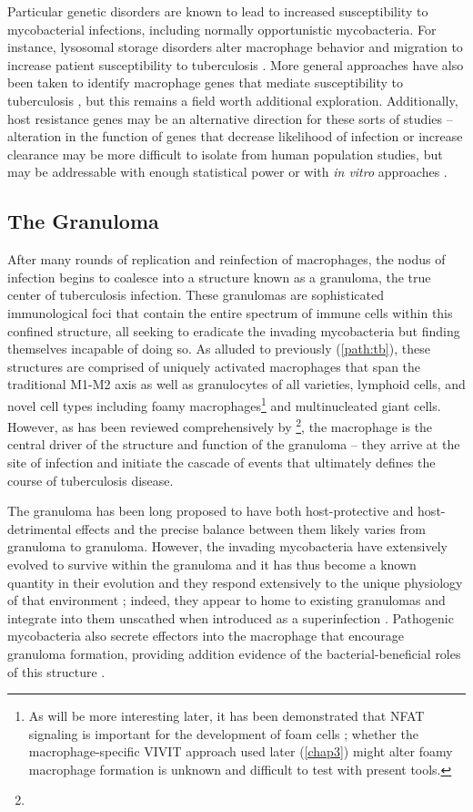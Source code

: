 Particular genetic disorders are known to lead to increased susceptibility to mycobacterial infections, including normally opportunistic mycobacteria. For instance, lysosomal storage disorders alter macrophage behavior and migration to increase patient susceptibility to tuberculosis \citep{Berg2016}. More general approaches have also been taken to identify macrophage genes that mediate susceptibility to tuberculosis \citep{Thuong2008}, but this remains a field worth additional exploration. Additionally, host resistance genes may be an alternative direction for these sorts of studies -- alteration in the function of genes that decrease likelihood of infection or increase clearance may be more difficult to isolate from human population studies, but may be addressable with enough statistical power or with \textit{in vitro} approaches \citep{Bourgeois2021}.

\subsection{The Granuloma}\label{mamaw}

After many rounds of replication and reinfection of macrophages, the nodus of infection begins to coalesce into a structure known as a granuloma, the true center of tuberculosis infection. These granulomas are sophisticated immunological foci that contain the entire spectrum of immune cells within this confined structure, all seeking to eradicate the invading mycobacteria but finding themselves incapable of doing so. As alluded to previously (\autoref{path:tb}), these structures are comprised of uniquely activated macrophages that span the traditional M1\hyp{}M2 axis as well as granulocytes of all varieties, lymphoid cells, and novel cell types including foamy macrophages\footnote{As will be more interesting later, it has been demonstrated that NFAT signaling is important for the development of foam cells \citep{Du2021}; whether the macrophage\hyp{}specific VIVIT approach used later (\autoref{chap3}) might alter foamy macrophage formation is unknown and difficult to test with present tools.} and multinucleated giant cells. However, as has been reviewed comprehensively by \citep{Pagan2018}\footnote{}, the macrophage is the central driver of the structure and function of the granuloma -- they arrive at the site of infection and initiate the cascade of events that ultimately defines the course of tuberculosis disease.

The granuloma has been long proposed to have both host\hyp{}protective and host\hyp{}detrimental effects and the precise balance between them likely varies from granuloma to granuloma. However, the invading mycobacteria have extensively evolved to survive within the granuloma and it has thus become a known quantity in their evolution and they respond extensively to the unique physiology of that environment \citep{Gagneux2018, Ramakrishnan2000}; indeed, they appear to home to existing granulomas and integrate into them unscathed when introduced as a superinfection \citep{Cosma2004}. Pathogenic mycobacteria also secrete effectors into the macrophage that encourage granuloma formation, providing addition evidence of the bacterial\hyp{}beneficial roles of this structure \citep{Volkman2004, Volkman2010}. 

